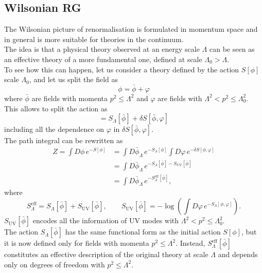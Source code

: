 \subsection{Wilsonian RG}
\label{sec:wilson_rg}
The Wilsonian picture of renormalisation \cite{WilsonRG1,WilsonRG2} is formulated in momentum space and in general is more suitable for theories in the continuum.\\
The idea is that a physical theory observed at an energy scale $\Lambda$ can be seen as an effective theory of a more fundamental one, defined at scale $\Lambda_0 > \Lambda$. \\
To see how this can happen, let us consider a theory defined by the action $S[\phi]$ scale $\Lambda_0$, and let us split the field as 
\begin{equation*} 
    \phi = \bar\phi + \varphi
\end{equation*} 
where $\bar\phi$ are fields with momenta $p^2 \leq \Lambda^2$ and $\varphi$ are fields with $\Lambda^2 < p^2 \leq \Lambda_0^{2}$. \\
This allows to split the action as
\begin{equation*} 
    [\bar\phi + \varphi] = S_{\Lambda}[\bar\phi] + \delta S[\bar\phi, \varphi]
\end{equation*}
including all the dependence on $\varphi$ in $\delta S[\bar\phi, \varphi]$. \\
The path integral can be rewritten as
\begin{equation*}
    \begin{aligned}
        Z = \int D\phi \, e^{-S[\phi]} &= \int D\bar\phi_{\Lambda} \, e^{-S_{\Lambda}[\phi]} \int D\varphi  \, e^{-\delta S[\phi, \varphi]}  \\
        &= \int D\bar\phi_{\Lambda} \, e^{-S_{\Lambda}[\bar\phi] - S_\text{UV}[\bar\phi]}\\
        &= \int D\bar\phi_{\Lambda} \, e^{-S_{\Lambda}^\text{eff}[\bar\phi]},
    \end{aligned}
\end{equation*}
where 
\begin{equation*}
    S_{\Lambda}^\text{eff} = S_{\Lambda}[\bar\phi] + S_\text{UV}[\bar\phi], \qquad  S_\text{UV}[\bar\phi] = -\log\left( \int D\varphi \, e^{-S_{\Lambda}[\phi, \varphi]}\right).
\end{equation*}
$ S_\text{UV}[\bar\phi]$ encodes all the information of UV modes with $\Lambda^2 < p^2 \leq \Lambda_0^2$. \\
The action $S_{\Lambda}[\bar\phi]$ has the same functional form as the initial action $S[\phi]$, but it is now defined only for fields with momenta $p^2 \leq \Lambda^{2}$. Instead, $S^\text{eff}_\Lambda[\bar\phi]$ constitutes an effective description of the original theory at scale $\Lambda$ and depends only on degrees of freedom with $p^2 \leq \Lambda^2$. \\
